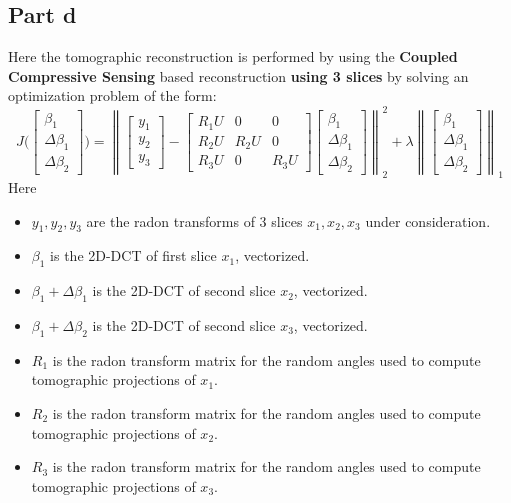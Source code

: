 \documentclass[12pt]{article}
\newcommand{\norm}[1]{\left\lVert #1 \right\rVert}
\begin{document}
\subsection*{Part d}
Here the tomographic reconstruction is performed by using the \textbf{Coupled Compressive Sensing} based reconstruction \textbf{using 3 slices} by solving an optimization problem of the form:
$$J\bigg(\begin{bmatrix}
\beta_1 \\ \Delta \beta_1 \\ \Delta \beta_2
\end{bmatrix}\bigg) = \norm{\begin{bmatrix}
	y_1\\y_2\\y_3
	\end{bmatrix} - \begin{bmatrix}
	R_1U & 0 & 0\\
	R_2U & R_2U & 0\\
	R_3U & 0 & R_3U
	\end{bmatrix} \begin{bmatrix}
	\beta_1 \\ \Delta \beta_1\\ \Delta \beta_2
	\end{bmatrix}}_2^2 + \lambda \norm{\begin{bmatrix}
	\beta_1 \\ \Delta \beta_1\\ \Delta \beta_2
	\end{bmatrix}}_1$$
Here 
\begin{itemize}
	\item  $y_1, y_2, y_3$ are the radon transforms of 3 slices $x_1, x_2, x_3$ under consideration.
	\item $\beta_1$ is the 2D-DCT of first slice $x_1$, vectorized.
	\item $\beta_1 + \Delta \beta_1$ is the 2D-DCT of second slice $x_2$, vectorized.
	\item $\beta_1 + \Delta \beta_2$ is the 2D-DCT of second slice $x_3$, vectorized.
	\item $R_1$ is the radon transform matrix for the random angles used to compute tomographic projections of $x_1$.
	\item $R_2$ is the radon transform matrix for the random angles used to compute tomographic projections of $x_2$.
	\item $R_3$ is the radon transform matrix for the random angles used to compute tomographic projections of $x_3$.
\end{itemize}
\end{document}

